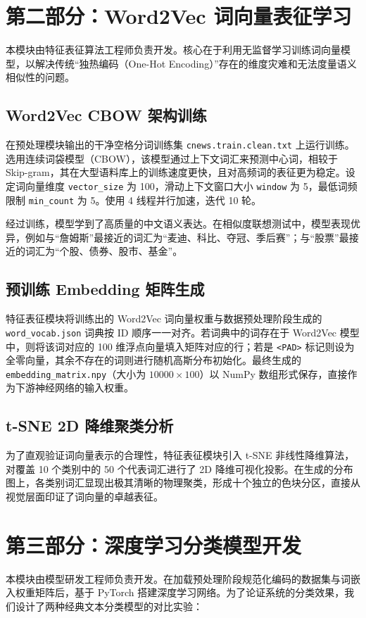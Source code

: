 \documentclass[UTF8,a4paper,11pt]{ctexart}
\begin{document}
\section{第二部分：Word2Vec 词向量表征学习}
本模块由特征表征算法工程师负责开发。核心在于利用无监督学习训练词向量模型，以解决传统“独热编码（One-Hot Encoding）”存在的维度灾难和无法度量语义相似性的问题。

\subsection{Word2Vec CBOW 架构训练}
在预处理模块输出的干净空格分词训练集 \texttt{cnews.train.clean.txt} 上运行训练。选用连续词袋模型（CBOW），该模型通过上下文词汇来预测中心词，相较于 Skip-gram，其在大型语料库上的训练速度更快，且对高频词的表征更为稳定。设定词向量维度 \texttt{vector\_size} 为 100，滑动上下文窗口大小 \texttt{window} 为 5，最低词频限制 \texttt{min\_count} 为 5。使用 4 线程并行加速，迭代 10 轮。

经过训练，模型学到了高质量的中文语义表达。在相似度联想测试中，模型表现优异，例如与“詹姆斯”最接近的词汇为“麦迪、科比、夺冠、季后赛”；与“股票”最接近的词汇为“个股、债券、股市、基金”。

\subsection{预训练 Embedding 矩阵生成}
特征表征模块将训练出的 Word2Vec 词向量权重与数据预处理阶段生成的 \texttt{word\_vocab.json} 词典按 ID 顺序一一对齐。若词典中的词存在于 Word2Vec 模型中，则将该词对应的 100 维浮点向量填入矩阵对应的行；若是 \texttt{<PAD>} 标记则设为全零向量，其余不存在的词则进行随机高斯分布初始化。最终生成的 \texttt{embedding\_matrix.npy}（大小为 $10000 \times 100$）以 NumPy 数组形式保存，直接作为下游神经网络的输入权重。

\subsection{t-SNE 2D 降维聚类分析}
为了直观验证词向量表示的合理性，特征表征模块引入 t-SNE 非线性降维算法，对覆盖 10 个类别中的 50 个代表词汇进行了 2D 降维可视化投影。在生成的分布图上，各类别词汇显现出极其清晰的物理聚类，形成十个独立的色块分区，直接从视觉层面印证了词向量的卓越表征。

\section{第三部分：深度学习分类模型开发}
本模块由模型研发工程师负责开发。在加载预处理阶段规范化编码的数据集与词嵌入权重矩阵后，基于 PyTorch 搭建深度学习网络。为了论证系统的分类效果，我们设计了两种经典文本分类模型的对比实验：
\end{document}

